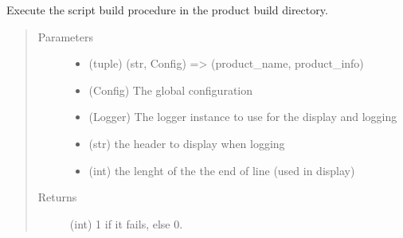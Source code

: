 \documentclass[a4paper,10pt,english]{sphinxmanual}
\begin{document}
\begin{fulllineitems}
\label{\detokenize{apidoc_commands/commands:commands.compile.compile_product_script}}
Execute the script build procedure in the product build directory.
\begin{quote}\begin{description}
\item[{Parameters}] \leavevmode\begin{itemize}
\item {} 
 \textendash{} (tuple) 
(str, Config) =\textgreater{} (product\_name, product\_info)

\item {} 
 \textendash{} (Config) The global configuration

\item {} 
 \textendash{} (Logger) 
The logger instance to use for the display and logging

\item {} 
 \textendash{} (str) the header to display when logging

\item {} 
 \textendash{} (int) the lenght of the the end of line (used in display)

\end{itemize}

\item[{Returns}] \leavevmode
(int) 1 if it fails, else 0.

\end{description}\end{quote}

\end{fulllineitems}


\begin{fulllineitems}
\label{\detokenize{apidoc_commands/commands:commands.compile.extend_with_children}}
\end{fulllineitems}
\end{document}
